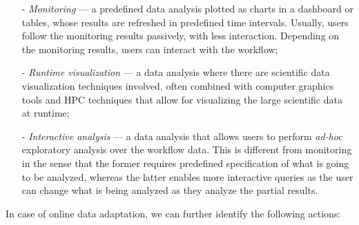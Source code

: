  \begin{itemize}
 \setlength\itemsep{-2mm}

    \item[-] \textit{Monitoring} --- a predefined data analysis plotted as charts in a dashboard or tables, whose results are refreshed in predefined time intervals. Usually, users follow the monitoring results passively, with less interaction. Depending on the monitoring results, users can interact with the workflow;

    \item[-] \textit{Runtime visualization} --- a data analysis where there are scientific data visualization techniques involved, often combined with computer graphics tools and HPC techniques that allow for visualizing the large scientific data at runtime;

    \item[-] \textit{Interactive analysis} --- a data analysis that allows users to perform \textit{ad-hoc} exploratory analysis over the workflow data. This is different from monitoring in the sense that the former requires predefined specification of what is going to be analyzed, whereas the latter enables more interactive queries as the user can change what is being analyzed as they analyze the partial results.

 \end{itemize}

In case of online data adaptation, we can further identify the following actions:

